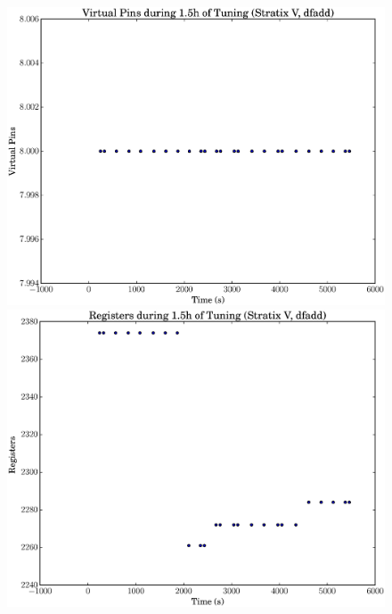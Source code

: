 \documentclass[12pt, a4paper]{article}
\begin{document}
\begin{figure}[htpb]
    \begin{minipage}{.48\textwidth}
        \includegraphics[scale=.25]{dfadd_pins_5400_chstone_StratixV}
    \end{minipage}%
    \hfill
    \begin{minipage}{.48\textwidth}
        \includegraphics[scale=.25]{dfadd_regs_5400_chstone_StratixV}
    \end{minipage}%


\end{figure}
\end{document}
